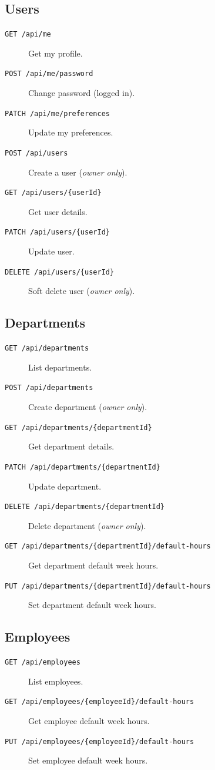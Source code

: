 \documentclass[11pt,a4paper]{article}
\begin{document}
\subsection{Users}
\begin{description}
    \item[\texttt{GET /api/me}] Get my profile.
    \item[\texttt{POST /api/me/password}] Change password (logged in).
    \item[\texttt{PATCH /api/me/preferences}] Update my preferences.
    \item[\texttt{POST /api/users}] Create a user (\textit{owner only}).
    \item[\texttt{GET /api/users/\{userId\}}] Get user details.
    \item[\texttt{PATCH /api/users/\{userId\}}] Update user.
    \item[\texttt{DELETE /api/users/\{userId\}}] Soft delete user (\textit{owner only}).
\end{description}

\subsection{Departments}
\begin{description}
    \item[\texttt{GET /api/departments}] List departments.
    \item[\texttt{POST /api/departments}] Create department (\textit{owner only}).
    \item[\texttt{GET /api/departments/\{departmentId\}}] Get department details.
    \item[\texttt{PATCH /api/departments/\{departmentId\}}] Update department.
    \item[\texttt{DELETE /api/departments/\{departmentId\}}] Delete department (\textit{owner only}).
    \item[\texttt{GET /api/departments/\{departmentId\}/default-hours}] Get department default week hours.
    \item[\texttt{PUT /api/departments/\{departmentId\}/default-hours}] Set department default week hours.
\end{description}

\subsection{Employees}
\begin{description}
    \item[\texttt{GET /api/employees}] List employees.
    \item[\texttt{GET /api/employees/\{employeeId\}/default-hours}] Get employee default week hours.
    \item[\texttt{PUT /api/employees/\{employeeId\}/default-hours}] Set employee default week hours.
\end{description}
\end{document}
